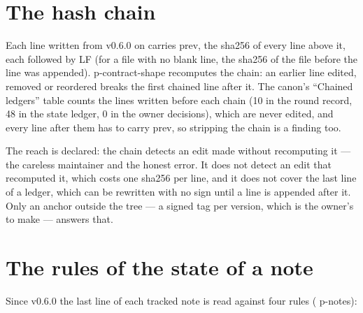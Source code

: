 \documentclass[
  american,
  10pt,
]{report}
\renewcommand{\texttt}[1]{{\ttfamily\hyphenchar\font=-1 #1}}
\begin{document}
\section{The hash chain}\label{the-hash-chain}

Each line written from v0.6.0 on carries \texttt{prev}, the sha256 of
every line above it, each followed by LF (for a file with no blank line,
the sha256 of the file before the line was appended).
\texttt{p-\allowbreak{}contract-\allowbreak{}shape} recomputes the
chain: an earlier line edited, removed or reordered breaks the first
chained line after it. The canon's ``Chained ledgers'' table counts the
lines written before each chain (10 in the round record, 48 in the state
ledger, 0 in the owner decisions), which are never edited, and every
line after them has to carry \texttt{prev}, so stripping the chain is a
finding too.

The reach is declared: the chain detects an edit made without
recomputing it --- the careless maintainer and the honest error. It does
not detect an edit that recomputed it, which costs one sha256 per line,
and it does not cover the last line of a ledger, which can be rewritten
with no sign until a line is appended after it. Only an anchor outside
the tree --- a signed tag per version, which is the owner's to make ---
answers that.

\section{The rules of the state of a
note}\label{the-rules-of-the-state-of-a-note}

Since v0.6.0 the last line of each tracked note is read against four
rules (\texttt{p-\allowbreak{}notes}):
\end{document}
